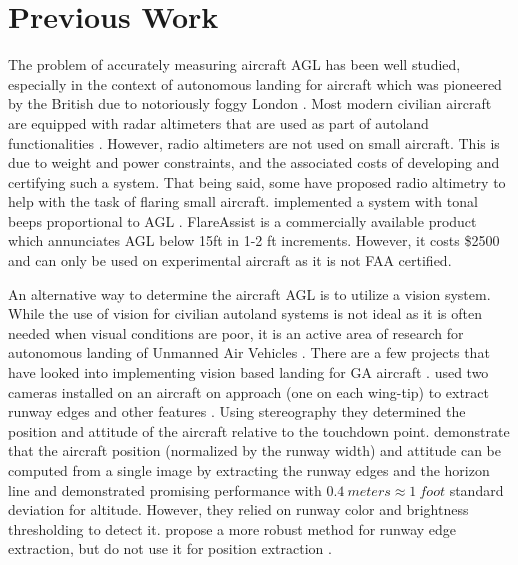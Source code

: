 \documentclass[letterpaper, conference]{IEEEtran}  %
\begin{document}
\section{Previous Work}
The problem of accurately measuring aircraft AGL has been well studied, especially in the context of autonomous landing for aircraft which was pioneered by the British due to notoriously foggy London \cite{Autolandwiki}. Most modern civilian aircraft are equipped with radar altimeters that are used as part of autoland functionalities \cite{RadioAltskybrary}. However, radio altimeters are not used on small aircraft. This is due to weight and power constraints, and the associated costs of developing and certifying such a system. That being said, some have proposed radio altimetry to help with the task of flaring small aircraft. \citeauthor{vidmar2006} implemented a system with tonal beeps proportional to AGL \cite{vidmar2006}. FlareAssist\texttrademark \cite{FlareAssist} is a commercially available product which annunciates AGL below 15ft in 1-2 ft increments. However, it costs \$2500 and can only be used on experimental aircraft as it is not FAA certified.

An alternative way to determine the aircraft AGL is to utilize a vision system. While the use of vision for civilian autoland systems is not ideal as it is often needed when visual conditions are poor, it is an active area of research for autonomous landing of Unmanned Air Vehicles \cite{Kong2014}. There are a few projects that have looked into implementing vision based landing for GA aircraft \cite{Liu2012}. \citeauthor{Trisiripisal2006} used two cameras installed on an aircraft on approach (one on each wing-tip) to extract runway edges and other features \cite{Trisiripisal2006}. Using stereography they determined the position and attitude of the aircraft relative to the touchdown point.  \citeauthor{Sasa2000} demonstrate that the aircraft position (normalized by the runway width) and attitude can be computed from a single image by extracting the runway edges and the horizon line \cite{Sasa2000} and demonstrated promising performance with $\SI{0.4}{meters} \approx \SI{1}{foot}$ standard deviation for altitude. However, they relied on runway color and brightness thresholding to detect it. \citeauthor{Naidu2011} propose a more robust method for runway edge extraction, but do not use it for position extraction \cite{Naidu2011}.
\end{document}
